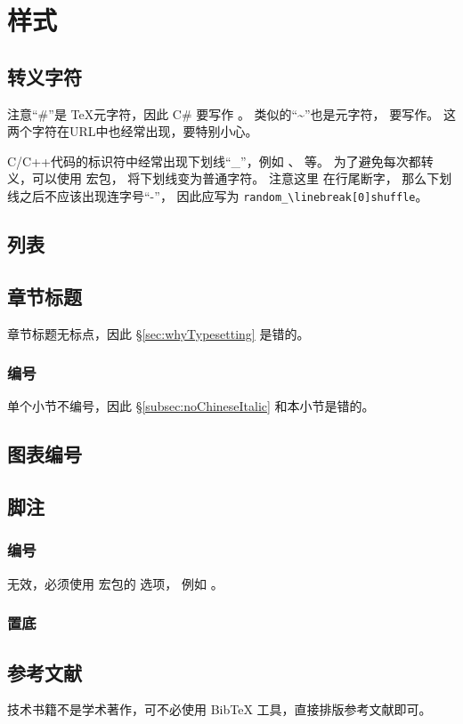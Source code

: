 \chapter{样式}

\section{转义字符}
注意“\#”是 \TeX 元字符，因此 C\# 要写作 。
类似的“\textasciitilde”也是元字符，
要写作。
这两个字符在URL中也经常出现，要特别小心。

C/C++代码的标识符中经常出现下划线“_”，例如 、
 等。
为了避免每次都转义，可以使用  宏包，
将下划线变为普通字符。
注意这里  在行尾断字，
那么下划线之后不应该出现连字号“-”，
因此应写为 \verb|random_\linebreak[0]shuffle|。

\section{列表}

\section{章节标题}
章节标题无标点，因此 \S \ref{sec:whyTypesetting} 是错的。

\subsection{编号}
单个小节不编号，因此 \S \ref{subsec:noChineseItalic} 和本小节是错的。

\section{图表编号}

\section{脚注}
\subsection{编号}
\begin{Code}
\end{Code}
无效，必须使用  宏包的  选项，
例如 。
\subsection{置底}


\section{参考文献}
技术书籍不是学术著作，可不必使用 BibTeX 工具，直接排版参考文献即可。